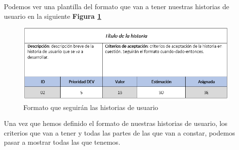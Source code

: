 Podemos ver una plantilla del formato que van a tener nuestras historias de usuario en la siguiente \textbf{Figura \ref{fig:formatoHistoria}}

\begin{figure}[H]
\centering
\includegraphics[scale=0.6]{imagenes/diseno/formatoHistoria.png}
\caption{Formato que seguirán las historias de usuario}
\label{fig:formatoHistoria}
\end{figure}

Una vez que hemos definido el formato de nuestras historias de usuario, los criterios que van a tener y todas las partes de las que van a constar, podemos pasar a mostrar todas las que tenemos. 
